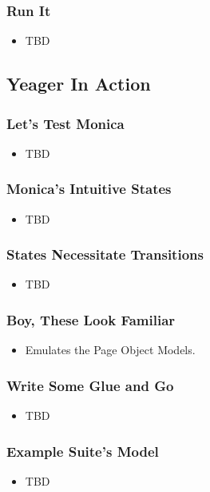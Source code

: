 \begin{frame}
  \frametitle{Run It}
  \begin{itemize}
    \item TBD
  \end{itemize}
\end{frame}

\subsection{Yeager In Action}

\begin{frame}
  \frametitle{Let's Test Monica}
  \begin{itemize}
    \item TBD
  \end{itemize}
\end{frame}

\begin{frame}
  \frametitle{Monica's Intuitive States}
  \begin{itemize}
    \item TBD
  \end{itemize}
\end{frame}

\begin{frame}
  \frametitle{States Necessitate Transitions}
  \begin{itemize}
    \item TBD
  \end{itemize}
\end{frame}

\begin{frame}
  \frametitle{Boy, These Look Familiar}
  \begin{itemize}
    \item Emulates the Page Object Models.
  \end{itemize}
\end{frame}

\begin{frame}
  \frametitle{Write Some Glue and Go}
  \begin{itemize}
    \item TBD
  \end{itemize}
\end{frame}

\begin{frame}
  \frametitle{Example Suite's Model}
  \begin{itemize}
    \item TBD
  \end{itemize}
\end{frame}

